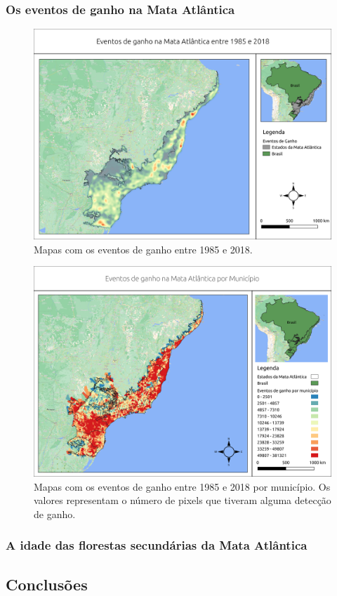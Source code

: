 \subsubsection{Os eventos de ganho na Mata Atlântica}

\begin{figure}[H]
    \centering
    \includegraphics[scale=.5]{images/heatmap_gain_masked18_dur_gt4_inv_for.png}
    \caption{Mapas com os eventos de ganho entre 1985 e 2018.}
    \label{fig:heat_gain}
\end{figure}

\begin{figure}[H]
    \centering
    \includegraphics[scale=.5]{images/mun_gain_seg6_masked18_dur_gt4_inv_for.png}
    \caption{Mapas com os eventos de ganho entre 1985 e 2018 por município. Os valores representam o número de pixels que tiveram alguma detecção de ganho.}
    \label{fig:mun_gain}
\end{figure}

\subsubsection{A idade das florestas secundárias da Mata Atlântica}

\subsection{Conclusões}